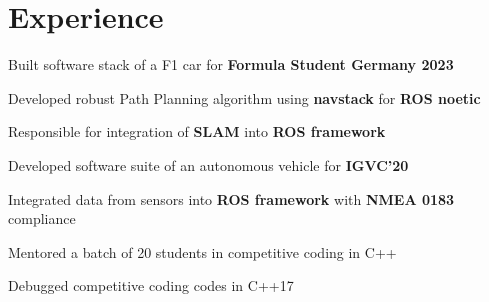 \documentclass[letterpaper]{deedy-resume} %
\begin{document}
\begin{minipage}[t]{0.66\textwidth} %


\section{Experience}

\hspace{5.6cm}
\vspace{\topsep}
\begin{tightitemize}
\item Built software stack of a F1 car for {\bf Formula Student Germany 2023}
\item Developed robust Path Planning algorithm using \textbf{navstack} for \textbf{ROS noetic}
\item Responsible for integration of {\bf SLAM} into {\bf ROS framework}
\end{tightitemize}

\sectionspace


\hspace{3.3cm}
\begin{tightitemize}
\item Developed software suite of an autonomous vehicle for {\bf IGVC'20}
\item Integrated data from sensors into {\bf{ROS framework}} with {\bf{NMEA 0183}} compliance
\end{tightitemize}

\sectionspace %


\hspace{5.1cm} 
\begin{tightitemize}
\item Mentored a batch of 20 students in competitive coding in C++
\item Debugged competitive coding codes in C++17
\end{tightitemize}



\end{minipage}
\end{document}
